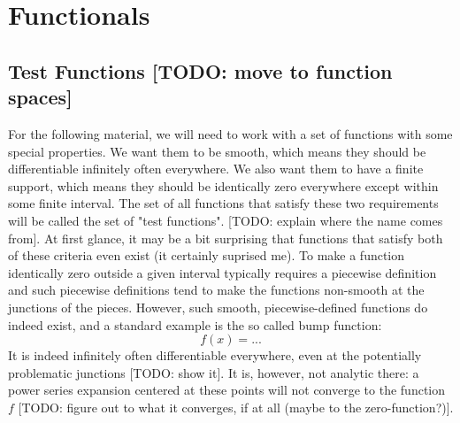 \section{Functionals} 




\subsection{Test Functions  [TODO: move to function spaces]}
For the following material, we will need to work with a set of functions with some special properties. We want them to be smooth, which means they should be differentiable infinitely often everywhere. We also want them to have a finite support, which means they should be identically zero everywhere except within some finite interval. The set of all functions that satisfy these two requirements will be called the set of "test functions". [TODO: explain where the name comes from]. At first glance, it may be a bit surprising that functions that satisfy both of these criteria even exist (it certainly suprised me). To make a function identically zero outside a given interval typically requires a piecewise definition and such piecewise definitions tend to make the functions non-smooth at the junctions of the pieces. However, such smooth, piecewise-defined functions do indeed exist, and a standard example is the so called bump function:
\begin{equation}
 f(x) = ...
\end{equation}
It is indeed infinitely often differentiable everywhere, even at the potentially problematic junctions [TODO: show it]. It is, however, not analytic there: a power series expansion centered at these points will not converge to the function $f$ [TODO: figure out to what it converges, if at all (maybe to the zero-function?)].



